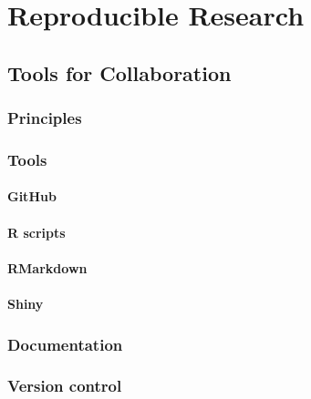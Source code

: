\documentclass[
]{book}
\begin{document}
\hypertarget{part-reproducible-research}{%
\part*{Reproducible Research}\label{part-reproducible-research}}

\hypertarget{tools_for_colab}{%
\chapter{Tools for Collaboration}\label{tools_for_colab}}

\hypertarget{principles-1}{%
\section{Principles}\label{principles-1}}

\hypertarget{tools}{%
\section{Tools}\label{tools}}

\hypertarget{github-1}{%
\subsection{GitHub}\label{github-1}}

\hypertarget{r-scripts}{%
\subsection{R scripts}\label{r-scripts}}

\hypertarget{rmarkdown}{%
\subsection{RMarkdown}\label{rmarkdown}}

\hypertarget{shiny}{%
\subsection{Shiny}\label{shiny}}

\hypertarget{documentation}{%
\section{Documentation}\label{documentation}}

\hypertarget{version-control}{%
\section{Version control}\label{version-control}}
\end{document}
